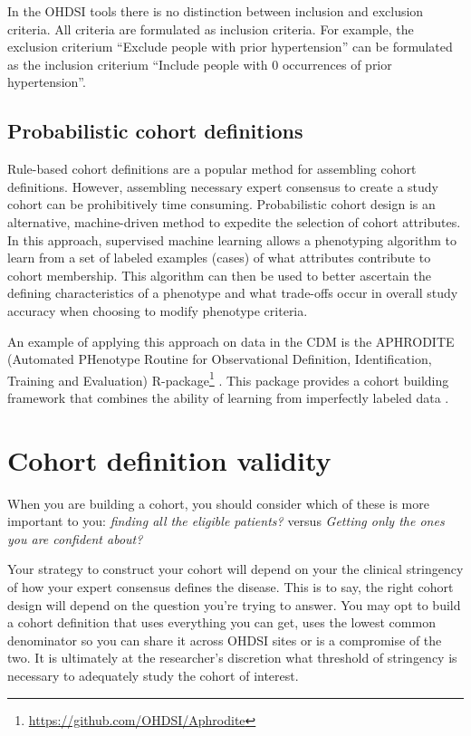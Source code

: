\documentclass[11pt]{book}
\let\rmarkdownfootnote\footnote%
\def\footnote{\protect\rmarkdownfootnote}
\theoremstyle{definition}
\theoremstyle{definition}
\theoremstyle{definition}
\theoremstyle{remark}
\let\BeginKnitrBlock\begin \let\EndKnitrBlock\end
\begin{document}
\BeginKnitrBlock{rmdimportant}
In the OHDSI tools there is no distinction between inclusion and exclusion criteria. All criteria are formulated as inclusion criteria. For example, the exclusion criterium ``Exclude people with prior hypertension'' can be formulated as the inclusion criterium ``Include people with 0 occurrences of prior hypertension''.
\EndKnitrBlock{rmdimportant}

\hypertarget{probabilistic-cohort-definitions}{%
\subsection{Probabilistic cohort definitions}\label{probabilistic-cohort-definitions}}

Rule-based cohort definitions are a popular method for assembling cohort definitions. However, assembling necessary expert consensus to create a study cohort can be prohibitively time consuming. Probabilistic cohort design is an alternative, machine-driven method to expedite the selection of cohort attributes. In this approach, supervised machine learning allows a phenotyping algorithm to learn from a set of labeled examples (cases) of what attributes contribute to cohort membership. This algorithm can then be used to better ascertain the defining characteristics of a phenotype and what trade-offs occur in overall study accuracy when choosing to modify phenotype criteria. 

An example of applying this approach on data in the CDM is the APHRODITE (Automated PHenotype Routine for Observational Definition, Identification, Training and Evaluation) R-package\footnote{\url{https://github.com/OHDSI/Aphrodite}} . This package provides a cohort building framework that combines the ability of learning from imperfectly labeled data \citep{Banda2017APHRODITE}. 

\hypertarget{cohort-definition-validity}{%
\section{Cohort definition validity}\label{cohort-definition-validity}}

When you are building a cohort, you should consider which of these is more important to you: \emph{finding all the eligible patients?} versus \emph{Getting only the ones you are confident about?}

Your strategy to construct your cohort will depend on your the clinical stringency of how your expert consensus defines the disease. This is to say, the right cohort design will depend on the question you're trying to answer. You may opt to build a cohort definition that uses everything you can get, uses the lowest common denominator so you can share it across OHDSI sites or is a compromise of the two. It is ultimately at the researcher's discretion what threshold of stringency is necessary to adequately study the cohort of interest.
\end{document}
